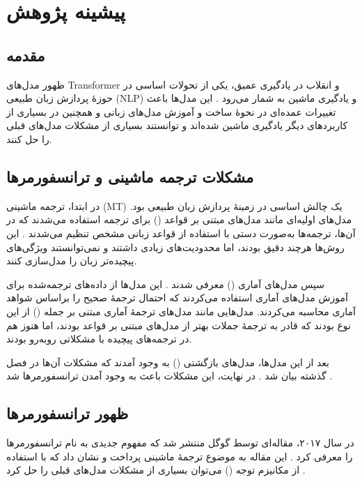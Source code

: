 \chapter{پیشینه پژوهش}

\section{مقدمه}
ظهور مدل‌های Transformer و انقلاب در یادگیری عمیق، یکی از تحولات اساسی در حوزهٔ پردازش زبان طبیعی (NLP) و یادگیری ماشین به شمار می‌رود \cite{vaswani2017attention,bahdanau2014neural}. این مدل‌ها باعث تغییرات عمده‌ای در نحوهٔ ساخت و آموزش مدل‌های زبانی و همچنین در بسیاری از کاربردهای دیگر یادگیری ماشین شده‌اند و توانستند بسیاری از مشکلات مدل‌های قبلی را حل کنند\cite{devlin2018bert,radford2018improving}.
\section{مشکلات ترجمه ماشینی و ترانسفورمرها}
در ابتدا، ترجمه ماشینی (MT) یک چالش اساسی در زمینهٔ پردازش زبان طبیعی بود. مدل‌های اولیه‌ای مانند مدل‌های مبتنی بر قواعد () برای ترجمه استفاده می‌شدند که در آن‌ها، ترجمه‌ها به‌صورت دستی با استفاده از قواعد زبانی مشخص تنظیم می‌شدند \cite{nagao1984framework,hutchins1986machine}. این روش‌ها هرچند دقیق بودند، اما محدودیت‌های زیادی داشتند و نمی‌توانستند ویژگی‌های پیچیده‌تر زبان را مدل‌سازی کنند.

سپس مدل‌های آماری () معرفی شدند \cite{brown1993mathematics,koehn2010statistical}. این مدل‌ها از داده‌های ترجمه‌شده برای آموزش مدل‌های آماری استفاده می‌کردند که احتمال ترجمهٔ صحیح را براساس شواهد آماری محاسبه می‌کردند. مدل‌هایی مانند مدل‌های ترجمهٔ آماری مبتنی بر جمله () \cite{koehn2003statistical} از این نوع بودند که قادر به ترجمهٔ جملات بهتر از مدل‌های مبتنی بر قواعد بودند، اما هنوز هم در ترجمه‌های پیچیده با مشکلاتی روبه‌رو بودند.

بعد از این مدل‌ها، مدل‌های بازگشتی () به وجود آمدند که مشکلات آن‌ها در فصل گذشته بیان شد \cite{elman1990finding,sutskever2014sequence}. در نهایت، این مشکلات باعث به وجود آمدن ترانسفورمرها شد \cite{bahdanau2014neural}.


\section{ظهور ترانسفورمرها}
در سال ۲۰۱۷، مقاله‌ای توسط گوگل منتشر شد که مفهوم جدیدی به نام ترانسفورمرها را معرفی کرد \cite{vaswani2017attention}. این مقاله به موضوع ترجمهٔ ماشینی پرداخت و نشان داد که با استفاده از مکانیزم توجه () می‌توان بسیاری از مشکلات مدل‌های قبلی را حل کرد \cite{luong2015effective}.

